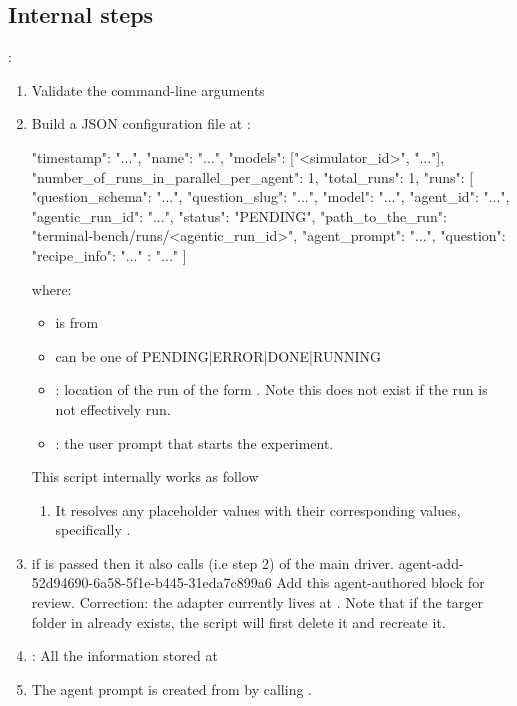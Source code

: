 \documentclass[11pt]{article}
\begin{document}
\subsection*{Internal steps}:
\begin{enumerate}
  \item Validate the command-line arguments
  \label{sec:agentic-rollout-run-configurations}
  \item Build a JSON configuration file at :
  \begin{DocCode}
    {
      "timestamp": "...",
      "name": "...",
      "models": ["<simulator_id>", "..."],
      "number_of_runs_in_parallel_per_agent": 1,
      "total_runs": 1,
      "runs": [
        {
          "question_schema": "...",
          "question_slug": "...",
          "model": "...",
          "agent_id": "...",
          "agentic_run_id": "...",
          "status": "PENDING",
          "path_to_the_run": "terminal-bench/runs/<agentic_run_id>",
          "agent_prompt": "...",
          "question": {
            "recipe_info": { "..." : "..." }
          }
        }
      ]
    }
    \end{DocCode}
  where:
  \begin{itemize}
    \item {} is from 
    \item {} can be one of PENDING|ERROR|DONE|RUNNING
    \item {}: location of the run of the form . 
    Note this does not exist if the run is not effectively run.
    \item {}: the user prompt that starts the experiment. 
  \end{itemize} 
  This script internally works as follow
    \begin{enumerate}
      \item It resolves any placeholder values with their corresponding values, specifically .
    \end{enumerate}
    \item if  is passed then it also calls  (i.e step 2) of the main driver.
    \agentProposedEdit
      {agent-add-52d94690-6a58-5f1e-b445-31eda7c899a6}
      {Add this agent-authored block for review.}
      {}
      {Correction: the adapter currently lives at .}
    Note that if the targer folder in  already exists, the script will first delete it and recreate it.
    \item {}: All the information stored at 
    \item The agent prompt is created from \hyperref[sec:generate-question-question-text]{} by calling .


\end{enumerate}
\end{document}
